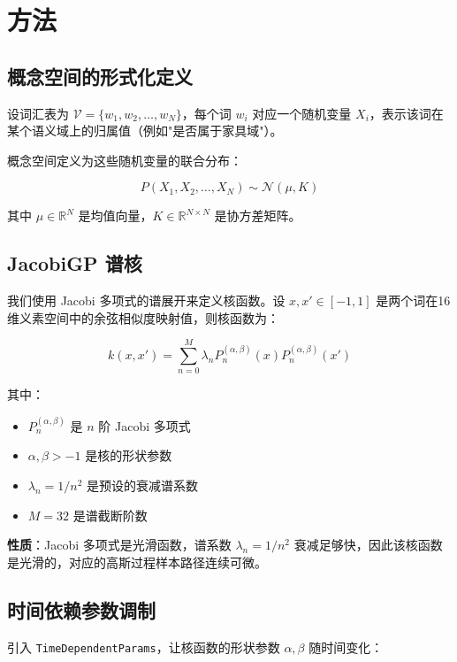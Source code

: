 \documentclass[12pt, a4paper]{article}
\begin{document}
\section{方法}

\subsection{概念空间的形式化定义}

设词汇表为 $\mathcal{V} = \{w_1, w_2, \ldots, w_N\}$，每个词 $w_i$ 对应一个随机变量 $X_i$，表示该词在某个语义域上的归属值（例如"是否属于家具域"）。

概念空间定义为这些随机变量的联合分布：

\begin{equation}
P(X_1, X_2, \ldots, X_N) \sim \mathcal{N}(\mu, K)
\end{equation}

其中 $\mu \in \mathbb{R}^N$ 是均值向量，$K \in \mathbb{R}^{N \times N}$ 是协方差矩阵。

\subsection{JacobiGP 谱核}

我们使用 Jacobi 多项式的谱展开来定义核函数。设 $x, x' \in [-1, 1]$ 是两个词在16维义素空间中的余弦相似度映射值，则核函数为：

\begin{equation}
k(x, x') = \sum_{n=0}^{M} \lambda_n P_n^{(\alpha, \beta)}(x) P_n^{(\alpha, \beta)}(x')
\end{equation}

其中：
\begin{itemize}
    \item $P_n^{(\alpha, \beta)}$ 是 $n$ 阶 Jacobi 多项式
    \item $\alpha, \beta > -1$ 是核的形状参数
    \item $\lambda_n = 1/n^2$ 是预设的衰减谱系数
    \item $M = 32$ 是谱截断阶数
\end{itemize}

\textbf{性质}：Jacobi 多项式是光滑函数，谱系数 $\lambda_n = 1/n^2$ 衰减足够快，因此该核函数是光滑的，对应的高斯过程样本路径连续可微。

\subsection{时间依赖参数调制}

引入 \texttt{TimeDependentParams}，让核函数的形状参数 $\alpha, \beta$ 随时间变化：
\end{document}
